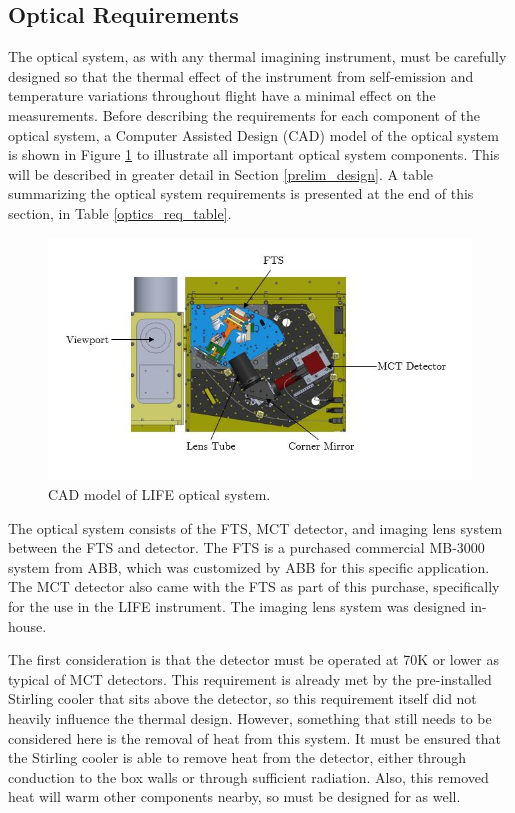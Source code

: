 \subsection{Optical Requirements}
The optical system, as with any thermal imagining instrument, must be carefully designed so that the thermal effect of the instrument from self-emission and temperature variations throughout flight have a minimal effect on the measurements. Before describing the requirements for each component of the optical system, a Computer Assisted Design (CAD) model of the optical system is shown in Figure \ref{fig:optical_system_diagram} to illustrate all important optical system components. This will be described in greater detail in Section \ref{prelim_design}. A table summarizing the optical system requirements is presented at the end of this section, in Table \ref{optics_req_table}.

\begin{figure}[h]
\centering
  \includegraphics[width=\linewidth]{chap3_images/optical_system_diagram.JPG}
  \caption{CAD model of LIFE optical system.}
  \label{fig:optical_system_diagram}
\end{figure}

The optical system consists of the FTS, MCT detector, and imaging lens system between the FTS and detector. The FTS is a purchased commercial MB-3000 system from ABB, which was customized by ABB for this specific application. The MCT detector also came with the FTS as part of this purchase, specifically for the use in the LIFE instrument. The imaging lens system was designed in-house. 

The first consideration is that the detector must be operated at 70K or lower as typical of MCT detectors. This requirement is already met by the pre-installed Stirling cooler that sits above the detector, so this requirement itself did not heavily influence the thermal design. However, something that still needs to be considered here is the removal of heat from this system. It must be ensured that the Stirling cooler is able to remove heat from the detector, either through conduction to the box walls or through sufficient radiation. Also, this removed heat will warm other components nearby, so must be designed for as well.

